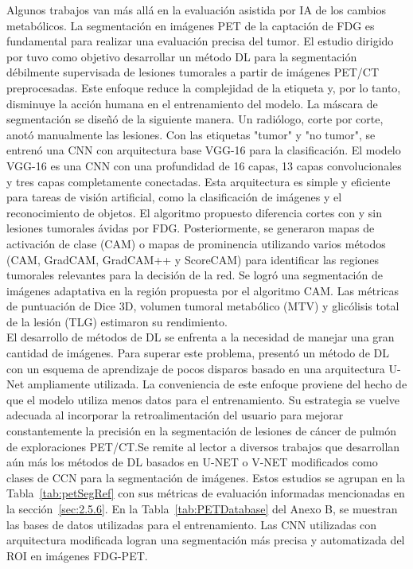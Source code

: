 \documentclass[11pt,a4paper,openany]{article}
\begin{document}
        Algunos trabajos van más allá en la evaluación asistida por IA de los cambios metabólicos. La segmentación en imágenes PET de la captación de FDG es fundamental para realizar una evaluación precisa del tumor. El estudio dirigido por \cite{Fruh2021} tuvo como objetivo desarrollar un método DL para la segmentación débilmente supervisada de lesiones tumorales a partir de imágenes PET/CT preprocesadas. Este enfoque reduce la complejidad de la etiqueta y, por lo tanto, disminuye la acción humana en el entrenamiento del modelo. La máscara de segmentación se diseñó de la siguiente manera. Un radiólogo, corte por corte, anotó manualmente las lesiones. Con las etiquetas "tumor" y "no tumor", se entrenó una CNN con arquitectura base VGG-16 para la clasificación. El modelo VGG-16 es una CNN con una profundidad de 16 capas, 13 capas convolucionales y tres capas completamente conectadas. Esta arquitectura es simple y eficiente para tareas de visión artificial, como la clasificación de imágenes y el reconocimiento de objetos. El algoritmo propuesto diferencia cortes con y sin lesiones tumorales ávidas por FDG. Posteriormente, se generaron mapas de activación de clase (CAM) o mapas de prominencia utilizando varios métodos (CAM, GradCAM, GradCAM++ y ScoreCAM) para identificar las regiones tumorales relevantes para la decisión de la red. Se logró una segmentación de imágenes adaptativa en la región propuesta por el algoritmo CAM. Las métricas de puntuación de Dice 3D, volumen tumoral metabólico (MTV) y glicólisis total de la lesión (TLG) estimaron su rendimiento. \\

        El desarrollo de métodos de DL se enfrenta a la necesidad de manejar una gran cantidad de imágenes. Para superar este problema, \cite{Protonotarios2022} presentó un método de DL con un esquema de aprendizaje de pocos disparos basado en una arquitectura U-Net ampliamente utilizada. La conveniencia de este enfoque proviene del hecho de que el modelo utiliza menos datos para el entrenamiento. Su estrategia se vuelve adecuada al incorporar la retroalimentación del usuario para mejorar constantemente la precisión en la segmentación de lesiones de cáncer de pulmón de exploraciones PET/CT.Se remite al lector a diversos trabajos que desarrollan aún más los métodos de DL basados en U-NET o V-NET modificados como clases de CCN para la segmentación de imágenes. Estos estudios se agrupan en la Tabla~\ref{tab:petSegRef} con sus métricas de evaluación informadas mencionadas en la sección~\ref{sec:2.5.6}. En la Tabla~\ref{tab:PETDatabase} del Anexo B, se muestran las bases de datos utilizadas para el entrenamiento. Las CNN utilizadas con arquitectura modificada logran una segmentación más precisa y automatizada del ROI en imágenes FDG-PET.\\
\end{document}
